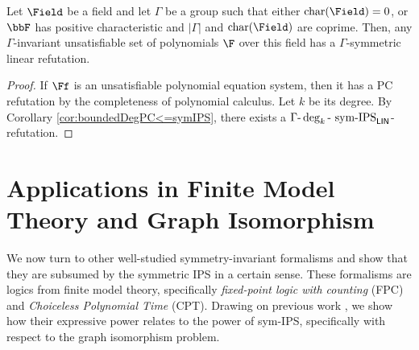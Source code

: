 \documentclass[a4paper,UKenglish,cleveref, autoref, thm-restate]{lipics-v2021}
\newcommand{\symIPSlin}{\text{ \upshape sym-IPS}_{\mathsf{LIN}}}
\DeclareMathOperator{\charact}{char}
\begin{document}
\begin{corollary}
	\label{cor:completenessOfSymLinIPS}
	Let $\Field$ be a field and let $\Gamma$ be a group
	such that either $\charact(\Field) = 0$, or $\bbF$ has positive characteristic and $|\Gamma|$ and $\charact(\Field)$ are coprime.  Then, any $\Gamma$-invariant unsatisfiable set of polynomials $\F$ over this field has a $\Gamma$-symmetric linear refutation.
\end{corollary}	
\begin{proof}
	If $\Ff$ is an unsatisfiable polynomial equation system, then it has a PC refutation by the completeness of polynomial calculus. Let $k$ be its degree. By Corollary \ref{cor:boundedDegPC<=symIPS}, there exists a $\Gamma\text{-}\deg_k\text{-}\symIPSlin{}$-refutation.
\end{proof}










\section{Applications in Finite Model Theory and Graph Isomorphism}
\label{sec:appplications}
We now turn to other well-studied symmetry-invariant formalisms and show that they are subsumed by the symmetric IPS in a certain sense. These formalisms are logics from finite model theory, specifically \emph{fixed-point logic with counting} (FPC) and \emph{Choiceless Polynomial Time} (CPT). Drawing on previous work \cite{ggpp, Pago}, we show how their expressive power relates to the power of sym-IPS, specifically with respect to the graph isomorphism problem.
\end{document}
